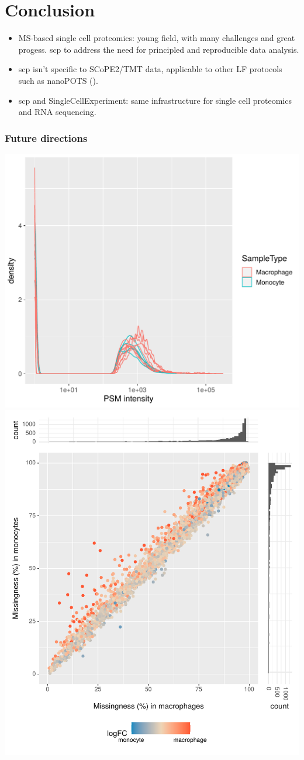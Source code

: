 \documentclass{beamer}
\newcommand{\hcode}[2][lgray]{{\ttfamily\color{vdgray}\colorbox{#1}{#2}}}
\newcommand{\frametitlesection}[1]{\frametitle{\centering #1 \footnotesize \hspace{0pt plus 1 filll} \insertsection}}
\begin{document}

\section{Conclusion}


\begin{frame}
  \begin{itemize}
  \item MS-based single cell proteomics: young field, with many
    challenges and great progess. \hcode{scp} to address the need for
    principled and reproducible data analysis.
  \item \hcode{scp} isn't specific to SCoPE2/TMT data, applicable to
    other LF protocols such as nanoPOTS (\citet{Williams2020-nv,Cong2020-kh}).
  \item \hcode{scp} and \hcode{SingleCellExperiment}: same
    infrastructure for single cell proteomics and RNA sequencing.
  \end{itemize}
\end{frame}

\begin{frame}
    \frametitlesection{Future directions}
    \includegraphics[width=.5\linewidth]{figs/PSM_intensity.pdf}
    \includegraphics[width=.4\linewidth]{figs/missingness.pdf}

\end{frame}
\end{document}
